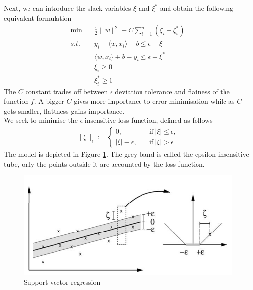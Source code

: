 Next, we can introduce the slack variables $\xi$ and $\xi^*$ and obtain the following equivalent formulation
\begin{equation}
    \begin{aligned}
        \min \quad& \frac{1}{2}\|w\|^2+C\sum\limits_{i=1}^n(\xi_i+\xi_i^*)
        \\
        s.t. \quad& y_i-\langle w, x_i\rangle-b\leq \epsilon+\xi
        \\
        \quad& \langle w, x_i\rangle +b-y_i\leq \epsilon+\xi^*
        \\
        \quad& \xi_i\geq0
        \\
        \quad& \xi_i^*\geq0
    \end{aligned}
\end{equation}
The $C$ constant trades off between $\epsilon$ deviation tolerance and flatness of the function $f$. A bigger $C$ gives more importance to error minimisation while as $C$ gets smaller, flattness gains importance.
\\
We seek to minimise the $\epsilon$ insensitive loss function, defined as follows
\begin{equation}
    \begin{aligned}
        \|\xi\|_\epsilon:=\begin{cases}
            0, \quad& \textrm{if} \ |\xi|\leq \epsilon,
            \\
            |\xi|-\epsilon, \quad& \textrm{if} \ |\xi| > \epsilon
        \end{cases}
    \end{aligned}
\end{equation}
The model is depicted in Figure \ref{fig:svm_simple}. The grey band is called the epsilon insensitive tube, only the points outside it are accounted by the loss function.
\begin{figure}
    \includegraphics[width=\textwidth]{images/svm_simple.png}    
    \caption{Support vector regression \cite{learning_with_kernels}}
    \label{fig:svm_simple}
\end{figure}

